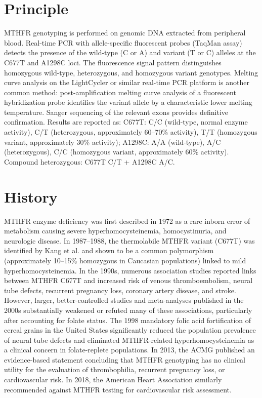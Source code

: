 \section*{Principle}
MTHFR genotyping is performed on genomic DNA extracted from peripheral blood. Real-time PCR with allele-specific fluorescent probes (TaqMan assay) detects the presence of the wild-type (C or A) and variant (T or C) alleles at the C677T and A1298C loci. The fluorescence signal pattern distinguishes homozygous wild-type, heterozygous, and homozygous variant genotypes. Melting curve analysis on the LightCycler or similar real-time PCR platform is another common method: post-amplification melting curve analysis of a fluorescent hybridization probe identifies the variant allele by a characteristic lower melting temperature. Sanger sequencing of the relevant exons provides definitive confirmation. Results are reported as: C677T: C/C (wild-type, normal enzyme activity), C/T (heterozygous, approximately 60--70\% activity), T/T (homozygous variant, approximately 30\% activity); A1298C: A/A (wild-type), A/C (heterozygous), C/C (homozygous variant, approximately 60\% activity). Compound heterozygous: C677T C/T + A1298C A/C.

\section*{History}
MTHFR enzyme deficiency was first described in 1972 as a rare inborn error of metabolism causing severe hyperhomocysteinemia, homocystinuria, and neurologic disease. In 1987--1988, the thermolabile MTHFR variant (C677T) was identified by Kang et al. and shown to be a common polymorphism (approximately 10--15\% homozygous in Caucasian populations) linked to mild hyperhomocysteinemia. In the 1990s, numerous association studies reported links between MTHFR C677T and increased risk of venous thromboembolism, neural tube defects, recurrent pregnancy loss, coronary artery disease, and stroke. However, larger, better-controlled studies and meta-analyses published in the 2000s substantially weakened or refuted many of these associations, particularly after accounting for folate status. The 1998 mandatory folic acid fortification of cereal grains in the United States significantly reduced the population prevalence of neural tube defects and eliminated MTHFR-related hyperhomocysteinemia as a clinical concern in folate-replete populations. In 2013, the ACMG published an evidence-based statement concluding that MTHFR genotyping has no clinical utility for the evaluation of thrombophilia, recurrent pregnancy loss, or cardiovascular risk. In 2018, the American Heart Association similarly recommended against MTHFR testing for cardiovascular risk assessment.

